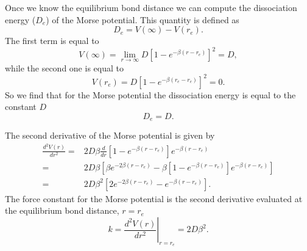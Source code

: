 \documentclass[../Main/chem331-notes.tex]{subfiles}
\begin{document}
Once we know the equilibrium bond distance we can compute the dissociation energy ($D_e$) of the Morse potential.
This quantity is defined as
\begin{equation}
D_e = V(\infty) - V(r_e).
\end{equation}
The first term is equal to
\begin{equation}
V(\infty) = \lim_{r \rightarrow \infty} D \left[1 - e^{-\beta (r - r_e)} \right]^2 = D,
\end{equation}
while the second one is equal to
\begin{equation}
V(r_e) = D \left[1 - e^{-\beta (r_e - r_e)} \right]^2 = 0.
\end{equation}
So we find that for the Morse potential the dissociation energy is equal to the constant $D$
\begin{equation}
D_e = D.
\end{equation}

The second derivative of the Morse potential is given by
\begin{equation}
\begin{split}
\frac{d^2 V(r)}{dr^2} = &  2 D \beta \frac{d}{dr} \left[1 - e^{-\beta (r - r_e)} \right] e^{-\beta (r - r_e)} \\
= & 2 D \beta \left[ \beta e^{-2\beta (r - r_e)}  - \beta  \left[1 - e^{-\beta (r - r_e)} \right] e^{-\beta (r - r_e)}\right] \\
= & 2 D \beta^2  \left[ 2e^{-2 \beta (r - r_e)} - e^{-\beta (r - r_e)}\right].
\end{split}
\end{equation}
The force constant for the Morse potential is the second derivative evaluated at the equilibrium bond distance, $r = r_e$
\begin{equation}
k = \left. \frac{d^2 V(r)}{dr^2} \right|_{r = r_e} =  2 D \beta^2.
\end{equation}
\end{document}
